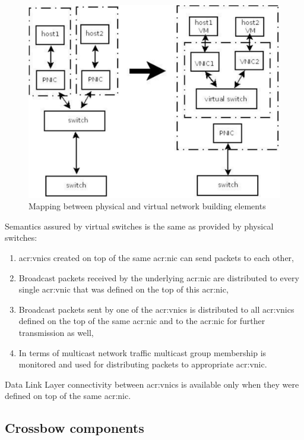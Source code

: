 \documentclass[11pt]{book}
\begin{document}
        \begin{figure}[H]
          \begin{center}
            \includegraphics[width=.7\textwidth]{img/physical_and_virtual_switches_mapping.pdf}
          \end{center}

          \caption{Mapping between physical and virtual network building elements}
        \end{figure}
        
        Semantics assured by virtual switches is the same as provided by physical switches: 

        \begin{enumerate}
          \item \gls{acr:vnic}s created on top of the same \gls{acr:nic} can send packets to each other,
          \item Broadcast packets received by the underlying \gls{acr:nic} are distributed to every single \gls{acr:vnic} that was defined
                on the top of this \gls{acr:nic},
          \item Broadcast packets sent by one of the \gls{acr:vnic}s is distributed to all \gls{acr:vnic}s defined on the top of the same
                \gls{acr:nic} and to the \gls{acr:nic} for further transmission as well,
          \item In terms of multicast network traffic multicast group membership is monitored and used for distributing
                packets to appropriate \gls{acr:vnic}.
        \end{enumerate}

        Data Link Layer connectivity between \gls{acr:vnic}s is available only when they were defined on top of the same \gls{acr:nic}. 

	
      \subsection{Crossbow components}
\end{document}
